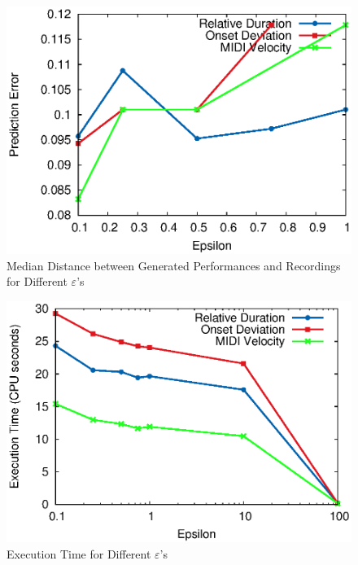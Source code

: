\begin{figure}[tp]
   \begin{center}
      \includegraphics[width=\textwidth]{fig/eps_accu.eps}

   \end{center}
   \caption{Median Distance between Generated Performances and Recordings for Different $\varepsilon$'s}
   \label{fig:eps_accu}
\end{figure}
\begin{figure}[tp]
   \begin{center}
      \includegraphics[width=\textwidth]{fig/eps_time.eps}

   \end{center}
   \caption{Execution Time for Different $\varepsilon$'s}
   \label{fig:eps_time}
\end{figure}

